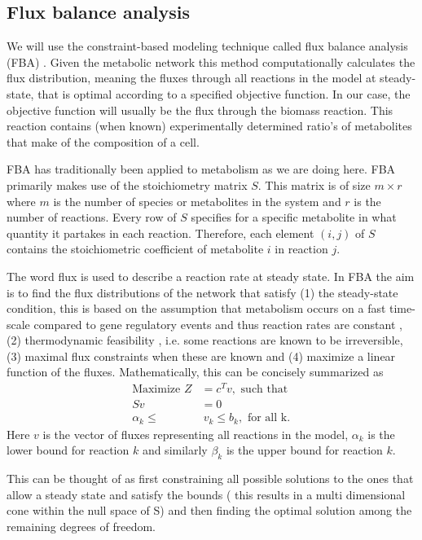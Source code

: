 \documentclass{article}
\begin{document}
\subsection*{Flux balance analysis}
We will use the constraint-based modeling technique called flux balance analysis (FBA) \cite{Orth2010}. Given the metabolic network this method computationally calculates the flux distribution, meaning the fluxes through all reactions in the model at steady-state, that is optimal according to a specified objective function. In our case, the objective function will usually be the flux through the biomass reaction. This reaction contains (when known) experimentally determined ratio's of metabolites that make of the composition of a cell.

FBA has traditionally been applied to metabolism as we are doing here. FBA primarily makes use of the stoichiometry matrix $S$. This matrix is of size $m \times r$ where $m$ is the number of species or metabolites in the system and $r$ is the number of reactions. Every row of $S$ specifies for a specific metabolite in what quantity it partakes in each reaction. Therefore, each element $(i,j)$ of $S$ contains the stoichiometric coefficient of metabolite $i$ in reaction $j$.

The word flux is used to describe a reaction rate at steady state. In FBA the aim is to find the flux distributions of the network that satisfy (1) the steady-state condition, this is based on the assumption that metabolism occurs on a fast time-scale compared to gene regulatory events and thus reaction rates are constant \cite{Heinrich1996}, (2) thermodynamic feasibility , i.e. some reactions are known to be irreversible, (3) maximal flux constraints when these are known and (4) maximize a linear function of the fluxes. Mathematically, this can be concisely summarized as
\begin{align*}
\text{Maximize } Z &=c^T v, \text{ such that } \\
Sv &= 0 \\
\alpha_k \leq & ~ v_k \leq b_k, \text{ for all k}.
\end{align*}
Here $v$ is the vector of fluxes representing all reactions in the model, $\alpha_k$ is the lower bound for reaction $k$ and similarly $\beta_k$ is the upper bound for reaction $k$.

This can be thought of as first constraining all possible solutions to the ones that allow a steady state and satisfy the bounds ( this results in a multi dimensional cone within the null space of S) and then finding the optimal solution among the remaining degrees of freedom.
\end{document}
